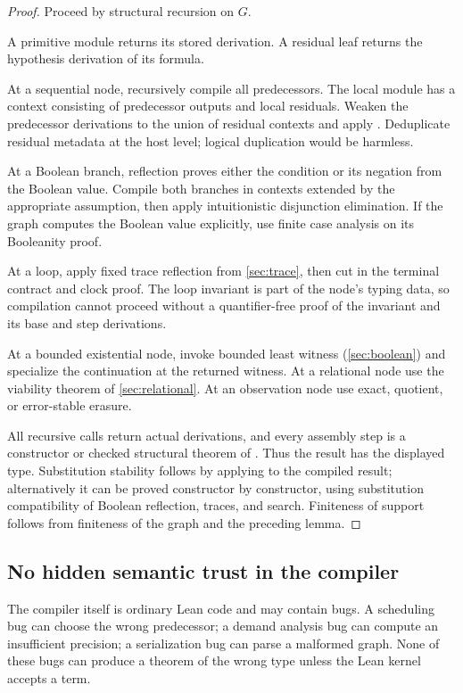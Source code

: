 \begin{proof}
Proceed by structural recursion on \(G\).

A primitive module returns its stored derivation.  A residual leaf returns the
hypothesis derivation of its formula.

At a sequential node, recursively compile all predecessors.  The local module
has a context consisting of predecessor outputs and local residuals.  Weaken
the predecessor derivations to the union of residual contexts and apply
.  Deduplicate residual metadata at the host level; logical
duplication would be harmless.

At a Boolean branch, reflection proves either the condition or its negation
from the Boolean value.  Compile both branches in contexts extended by the
appropriate assumption, then apply intuitionistic disjunction elimination.
If the graph computes the Boolean value explicitly, use finite case analysis
on its Booleanity proof.

At a loop, apply fixed trace reflection from
\cref{sec:trace}, then cut in the terminal contract and clock proof.  The loop
invariant is part of the node's typing data, so compilation cannot proceed
without a quantifier-free proof of the invariant and its base and step
derivations.

At a bounded existential node, invoke bounded least witness
(\cref{sec:boolean}) and specialize the continuation at the returned witness.
At a relational node use the viability theorem of
\cref{sec:relational}.  At an observation node use exact, quotient, or
error-stable erasure.

All recursive calls return actual derivations, and every assembly step is a
constructor or checked structural theorem of .  Thus the result has
the displayed type.  Substitution stability follows by applying
 to the compiled result; alternatively it can be proved
constructor by constructor, using substitution compatibility of Boolean
reflection, traces, and search.  Finiteness of support follows from finiteness
of the graph and the preceding lemma.
\end{proof}

\subsection{No hidden semantic trust in the compiler}

The compiler itself is ordinary Lean code and may contain bugs.  A scheduling
bug can choose the wrong predecessor; a demand analysis bug can compute an
insufficient precision; a serialization bug can parse a malformed graph.
None of these bugs can produce a theorem of the wrong type unless the Lean
kernel accepts a  term.

